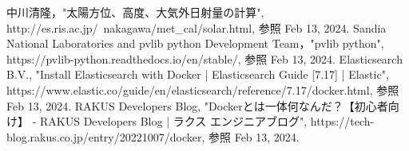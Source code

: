 \begin{thebibliography}{99}

中川清隆，"太陽方位、高度、大気外日射量の計算",\\ http://es.ris.ac.jp/~nakagawa/met\_cal/solar.html, 参照 Feb 13, 2024.
Sandia National Laboratories and pvlib python Development Team，"pvlib python",\\ https://pvlib-python.readthedocs.io/en/stable/, 参照 Feb 13, 2024.
Elasticsearch B.V., "Install Elasticsearch with Docker | Elasticsearch Guide [7.17] | Elastic",\\ https://www.elastic.co/guide/en/elasticsearch/reference/7.17/docker.html, 参照 Feb 13, 2024.
RAKUS Developers Blog, "Dockerとは一体何なんだ？【初心者向け】 - RAKUS Developers Blog | ラクス エンジニアブログ", https://tech-blog.rakus.co.jp/entry/20221007/docker, 参照 Feb 13, 2024.
\end{thebibliography}

